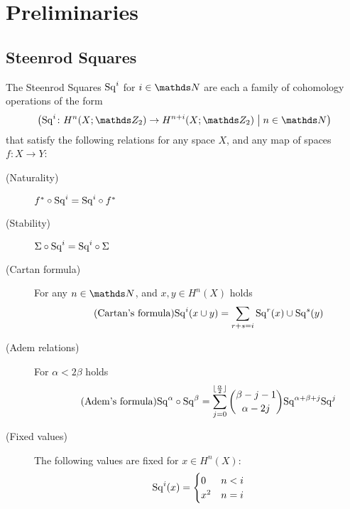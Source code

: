 % 

\chapter{Preliminaries}
\section{Steenrod Squares}

\begin{Def}\label{def:sq} %
  The Steenrod Squares $\mathrm{Sq}^{i}$ for $i\in\Nat$ are each a family of
  cohomology operations of the form
  \begin{gather*}
    \left(
      \Sq i\colon H^n(X;\Zmod2) \to H^{n+i}(X;\Zmod2)
      \;\middle|\;
      n\in\Nat
    \right)
  \end{gather*}
  that satisfy the following relations for any space $X$, and any map of
  spaces $f\colon X\to Y$:
  \begin{description}
  \item[(Naturality)] ${f}^*\circ\mathrm{Sq}^{i} = \mathrm{Sq}^{i}\circ{f}^*$
  \item[(Stability)] $\Sigma\circ\mathrm{Sq}^{i} = \mathrm{Sq}^{i}\circ\Sigma$ %
  \item[(Cartan formula)] For any $n\in\Nat$, and $x,y\in H^n(X)$ holds
    \begin{gather}\label{cartan}\tag{Cartan's formula}
      \mathrm{Sq}^{i}(x\cup y) = \sum_{r+s=i}\mathrm{Sq}^{r}(x)\cup\mathrm{Sq}^{s}(y)
    \end{gather}
  \item[(Adem relations)] For $\alpha<2\beta$ holds
    \begin{gather}\label{adem}\tag{Adem's formula}
      \mathrm{Sq}^{\alpha} \circ \mathrm{Sq}^{\beta} =
      \sum_{j=0}^{\lfloor \frac \alpha 2 \rfloor}
      \binom{\beta-j-1}{\alpha-2j}
      \mathrm{Sq}^{\alpha+\beta+j}\mathrm{Sq}^{j}
    \end{gather}
  \item[(Fixed values)] The following values are fixed for $x\in H^n(X)$:
    \begin{gather}\label{sqlowerbound}
      \Sq i(x) = \begin{cases}
        0 & n<i \\
        x^2 & n=i
      \end{cases}

\end{gather}
\end{description}
\end{Def}
